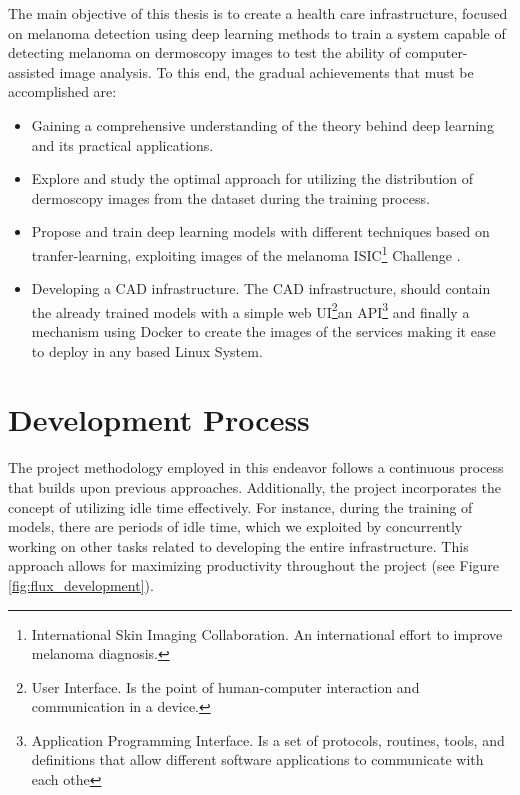 The main objective of this thesis is to create a health care infrastructure,
focused on melanoma detection using deep learning methods to train a system
capable of detecting melanoma on dermoscopy images to test the ability of
computer-assisted image analysis. To this end, the gradual achievements that
must be accomplished are:

\begin{itemize}

  \item Gaining a comprehensive understanding of the theory
    behind deep learning and its practical applications.

  \item Explore and study the optimal approach for utilizing the distribution
    of dermoscopy images from the dataset during the training process.

  \item Propose and train deep learning models with different techniques based on
    tranfer-learning, exploiting images of the melanoma
    ISIC\footnote{International Skin Imaging Collaboration. An international
    effort to improve melanoma diagnosis.} Challenge \cite{IsicChallenge}.

  \item Developing a CAD infrastructure. The CAD infrastructure, should contain
    the already trained models with a simple web UI\footnote{User Interface. Is
    the point of human-computer interaction and communication in a device.}an
    API\footnote{Application Programming Interface. Is a set of protocols,
      routines, tools, and definitions that allow different software applications
    to communicate with each othe} and finally a mechanism using Docker to create
    the images of the services making it ease to deploy in any based Linux System.

\end{itemize}


\section*{Development Process}

The project methodology employed in this endeavor follows a continuous process
that builds upon previous approaches. Additionally, the project incorporates
the concept of utilizing idle time effectively. For instance, during the
training of models, there are periods of idle time, which we exploited by
concurrently working on other tasks related to developing the entire
infrastructure. This approach allows for maximizing productivity throughout the
project (see Figure \ref{fig:flux_development}).

